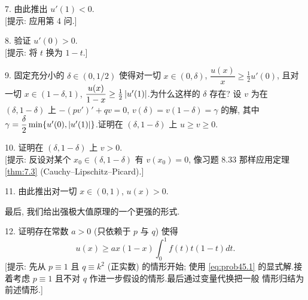 \begin{problem}
7. 由此推出 $u'(1)<0$.\\
{[提示: 应用第 4 问.]}

8. 验证 $u'(0)>0$.\\
{[提示: 将 $t$ 换为 $1-t$.]}

9. 固定充分小的 $\delta\in(0,1/2)$ 使得对一切 $x\in(0,\delta)$, $\dfrac{u(x)}{x}\ge\frac12u'(0)$,
且对一切 $x\in(1-\delta,1)$, $\dfrac{u(x)}{1-x}\ge\frac12\left|u'(1)\right|$.为什么这样的 $\delta$
存在? 设 $v$ 为在 $(\delta,1-\delta)$ 上 $-(pv')'+qv=0$, $v(\delta)=v(1-\delta)=\gamma$
的解, 其中 $\gamma=\dfrac\delta2\min\{u'(0),\left|u'(1)\right|\}$.证明在 $(\delta,1-\delta)$
上 $u\ge v\ge0$.

10. 证明在 $(\delta,1-\delta)$ 上 $v>0$.\\
{[提示: 反设对某个 $x_0\in(\delta,1-\delta)$ 有 $v(x_0)=0$, 像习题 8.33 那样应用定理
 \ref{thm:7.3} (Cauchy--Lipschitz--Picard).]}

11. 由此推出对一切 $x\in(0,1)$, $u(x)>0$.

最后, 我们给出强极大值原理的一个更强的形式.

12. 证明存在常数 $a>0$ (只依赖于 $p$ 与 $q$) 使得
\begin{equation*}
u(x)\ge ax(1-x)\int_0^1f(t)t(1-t)dt.
\end{equation*}
[提示: 先从 $p\equiv1$ 且 $q\equiv k^2$ (正实数) 的情形开始; 使用 \eqref{eq:prob45.1}
的显式解.接着考虑 $p\equiv1$ 且不对 $q$ 作进一步假设的情形.最后通过变量代换把一般
情形归结为前述情形.]
\end{problem}

